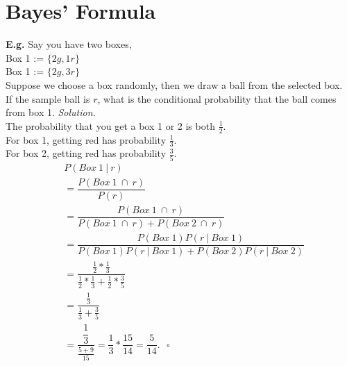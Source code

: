 \documentclass[12pt]{book}
\begin{document}
\section{Bayes' Formula}
\textbf{E.g. } Say you have two boxes, \\
Box 1 := $\{2g,1r\}$\\
Box 1 := $\{2g,3r\}$\\

\noindent Suppose we choose a box randomly,
then we draw a ball from the selected box.\\
If the sample ball is $r$, what is the conditional probability 
that the ball comes from box 1.
\newpage
\noindent \textit{Solution. }\\
The probability that you get a box 1 or 2 is both $\frac{1}{2}$.\\
For box 1, getting red has probability $\frac{1}{3}$.\\
\noindent For box 2, getting red has probability $\frac{3}{5}$.\\
\begin{align*}
&P(Box~1~|~r)\\
&=\dfrac{P(Box~1~\cap~r)}{P(r)}\\
&=\dfrac{P(Box~1~\cap~r)}{P(Box~1~\cap~r)+P(Box~2~\cap~r)}\\
&=\dfrac{P(Box~1)P(r~|~Box~1)}{P(Box~1)P(r~|~Box~1)+P(Box~2)P(r~|~Box~2)}\\
&=\dfrac{\frac{1}{2}* \frac{1}{3}}{\frac{1}{2} * \frac{1}{3} + \frac{1}{2} * \frac{3}{5}}\\
&=\dfrac{\frac{1}{3}}{\frac{1}{3} + \frac{3}{5}}\\
&=\dfrac{\dfrac{1}{3}}{\frac{5+9}{15}}=\dfrac{1}{3}* \dfrac{15}{14}=\dfrac{5}{14}.~~~\square
\end{align*}
\end{document}
